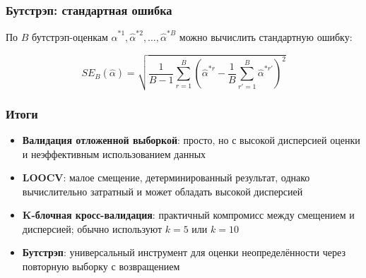 \documentclass{beamer}
\begin{document}
\begin{frame}
  \frametitle{Бутстрэп: стандартная ошибка}

  По $B$ бутстрэп-оценкам $\hat{\alpha}^{*1}, \hat{\alpha}^{*2}, \ldots, \hat{\alpha}^{*B}$ можно вычислить стандартную ошибку:

  $$SE_B(\hat{\alpha}) = \sqrt{\frac{1}{B-1} \sum_{r=1}^{B} \left(\hat{\alpha}^{*r} - \frac{1}{B} \sum_{r'=1}^{B} \hat{\alpha}^{*r'}\right)^2}$$

\end{frame}


\begin{frame}
  \frametitle{Итоги}

  \begin{itemize}
    \item \textbf{Валидация отложенной выборкой}: просто, но с высокой дисперсией оценки и неэффективным использованием данных
    \vspace{0.3cm}
    \item \textbf{LOOCV}: малое смещение, детерминированный результат, однако вычислительно затратный и может обладать высокой дисперсией
    \vspace{0.3cm}
    \item \textbf{K-блочная кросс-валидация}: практичный компромисс между смещением и дисперсией; обычно используют $k = 5$ или $k = 10$
    \vspace{0.3cm}
    \item \textbf{Бутстрэп}: универсальный инструмент для оценки неопределённости через повторную выборку с возвращением
  \end{itemize}
\end{frame}
\end{document}
